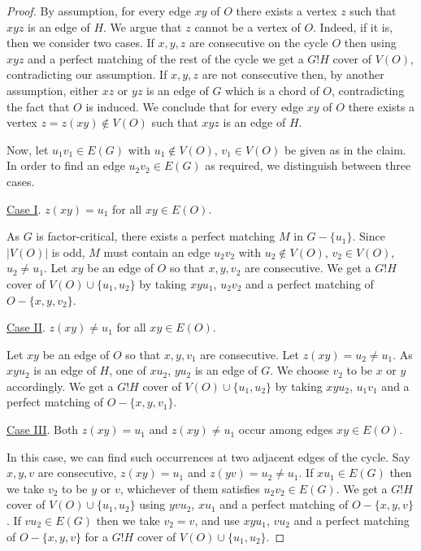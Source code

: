 \documentclass[10pt,a4paper]{amsart}
\begin{document}
\begin{proof} By assumption, for every edge $xy$ of $O$ there exists a vertex $z$ such that $xyz$ is an edge of $H$. We argue that $z$ cannot be a vertex of $O$. Indeed, if it is, then we consider two cases. If $x, y, z$ are consecutive on the cycle $O$ then using $xyz$ and a perfect matching of the rest of the cycle we get a $G!H$ cover of $V(O)$, contradicting our assumption. If $x, y, z$ are not consecutive then, by another assumption, either $xz$ or $yz$ is an edge of $G$ which is a chord of $O$, contradicting the fact that $O$ is induced. We conclude that for every edge $xy$ of $O$ there exists a vertex $z = z(xy) \notin V(O)$ such that $xyz$ is an edge of $H$.

Now, let $u_1v_1 \in E(G)$ with $u_1 \notin V(O)$, $v_1 \in V(O)$ be given as in the claim. In order to find an edge $u_2v_2 \in E(G)$ as required, we distinguish between three cases.

\vspace{5pt}

\noindent \underline{Case I}. $z(xy) = u_1$ for all $xy \in E(O)$.

As $G$ is factor-critical, there exists a perfect matching $M$ in $G - \{u_1\}$. Since $|V(O)|$ is odd, $M$ must contain an edge $u_2v_2$ with $u_2 \notin V(O)$, $v_2 \in V(O)$, $u_2 \ne u_1$. Let $xy$ be an edge of $O$ so that $x, y, v_2$ are consecutive. We get a $G!H$ cover of $V(O) \cup \{u_1,u_2\}$ by taking $xyu_1$, $u_2v_2$ and a perfect matching of $O - \{x, y, v_2\}$.

\vspace{5pt}

\noindent \underline{Case II}. $z(xy) \ne u_1$ for all $xy \in E(O)$.

Let $xy$ be an edge of $O$ so that $x, y, v_1$ are consecutive. Let $z(xy) = u_2 \ne u_1$. As $xyu_2$ is an edge of $H$, one of $xu_2$, $yu_2$ is an edge of $G$. We choose $v_2$ to be $x$ or $y$ accordingly. We get a $G!H$ cover of $V(O) \cup \{u_1, u_2\}$ by taking $xyu_2$, $u_1v_1$ and a perfect matching of $O - \{x, y, v_1\}$.

\vspace{5pt}

\noindent \underline{Case III}. Both $z(xy) = u_1$ and $z(xy) \ne u_1$ occur among edges $xy \in E(O)$.

In this case, we can find such occurrences at two adjacent edges of the cycle. Say $x, y, v$ are consecutive, $z(xy) = u_1$ and $z(yv) = u_2 \ne u_1$. If $xu_1 \in E(G)$ then we take $v_2$ to be $y$ or $v$, whichever of them satisfies $u_2v_2 \in E(G)$. We get a $G!H$ cover of $V(O) \cup \{u_1, u_2\}$ using $yvu_2$, $xu_1$ and a perfect matching of $O - \{x, y, v\}$. If $vu_2 \in E(G)$ then we take $v_2 = v$, and use $xyu_1$, $vu_2$ and a perfect matching of $O - \{x, y, v\}$ for a $G!H$ cover of $V(O) \cup \{u_1, u_2\}$.


\end{proof}
\end{document}
